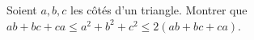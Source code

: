 Soient $a, b, c$ les côtés d'un triangle. Montrer que $ab + bc + ca \leq a^2 + b^2 + c^2 \leq 2(ab + bc + ca)$.
